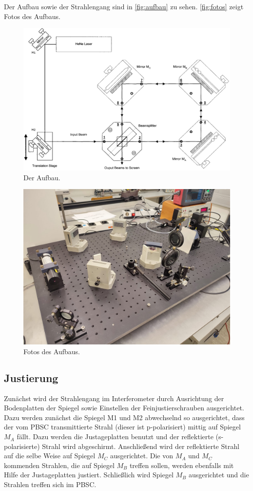 Der Aufbau sowie der Strahlengang sind in \autoref{fig:aufbau} zu sehen.
\autoref{fig:fotos} zeigt Fotos des Aufbaus.

\begin{figure}
    \centering
    \includegraphics[width=0.7\linewidth]{./figures/aufbau.png}
    \caption{Der Aufbau. \cite{Anleitung}}
    \label{fig:aufbau}
\end{figure}

\begin{figure}
    \centering
    \includegraphics[width=0.7\linewidth]{./figures/aufbau_foto.jpeg}
    \caption{Fotos des Aufbaus.}
    \label{fig:fotos}
\end{figure}

\subsection{Justierung}
Zunächst wird der Strahlengang im Interferometer durch Ausrichtung der Bodenplatten der Spiegel sowie Einstellen der Feinjustierschrauben ausgerichtet. Dazu werden zunächst die Spiegel M1 und M2 abwechselnd so ausgerichtet, dass der vom PBSC transmittierte Strahl (dieser ist p-polarisiert) mittig auf Spiegel $M_A$ fällt. Dazu werden die Justageplatten benutzt und der reflektierte (s-polarisierte) Strahl wird abgeschirmt. Anschließend wird der reflektierte Strahl auf die selbe Weise auf Spiegel $M_C$ ausgerichtet. Die von $M_A$ und $M_C$ kommenden Strahlen, die auf Spiegel $M_B$ treffen sollen, werden ebenfalls mit Hilfe der Justageplatten justiert. Schließlich wird Spiegel $M_B$ ausgerichtet und die Strahlen treffen sich im PBSC.

